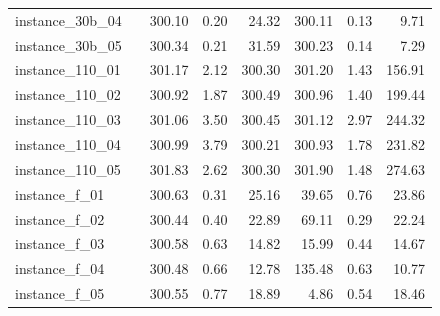\documentclass[12pt,a4paper,openright,twoside]{book}
\begin{document}
\begin{table}[H]
{\begin{tabular}{|ll|rrr|rrr|}
instance\_30b\_04             &     &   300.10 &      0.20 &      24.32   &  300.11 &     0.13 &     9.71 \\   
instance\_30b\_05             &     &   300.34 &      0.21 &      31.59   &  300.23 &     0.14 &     7.29 \\   
instance\_110\_01            &     &   301.17 &      2.12 &     300.30   &  301.20 &     1.43 &   156.91 \\   
instance\_110\_02            &     &   300.92 &      1.87 &     300.49   &  300.96 &     1.40 &   199.44 \\   
instance\_110\_03            &     &   301.06 &      3.50 &     300.45   &  301.12 &     2.97 &   244.32 \\   
instance\_110\_04            &     &   300.99 &      3.79 &     300.21   &  300.93 &     1.78 &   231.82 \\   
instance\_110\_05            &     &   301.83 &      2.62 &    300.30 &   301.90 &     1.48 &   274.63 \\ 
instance\_f\_01              &     &   300.63 &      0.31 &    25.16 &   39.65 &     0.76 &   23.86 \\  
instance\_f\_02              &     &   300.44 &      0.40 &    22.89 &    69.11 &     0.29 &   22.24 \\  
instance\_f\_03              &     &   300.58 &      0.63 &    14.82 &    15.99 &     0.44 &   14.67 \\  
instance\_f\_04              &     &   300.48 &      0.66 &    12.78 &   135.48 &     0.63 &   10.77 \\  
instance\_f\_05              &     &   300.55 &      0.77 &    18.89 &     4.86 &     0.54 &   18.46 \\ 

\hline
\end{tabular}
}
\end{table}
\end{document}
